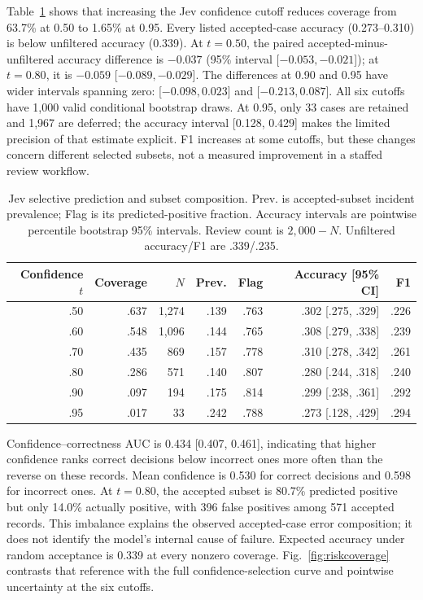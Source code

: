 \documentclass{llncs}
\begin{document}
Table~\ref{tab:selective} shows that increasing the Jev confidence cutoff reduces coverage from 63.7\% at 0.50 to 1.65\% at 0.95. Every listed accepted-case accuracy (0.273--0.310) is below unfiltered accuracy (0.339). At $t=0.50$, the paired accepted-minus-unfiltered accuracy difference is $-0.037$ (95\% interval [$-0.053,-0.021$]); at $t=0.80$, it is $-0.059$ [$-0.089,-0.029$]. The differences at 0.90 and 0.95 have wider intervals spanning zero: [$-0.098,0.023$] and [$-0.213,0.087$]. All six cutoffs have 1,000 valid conditional bootstrap draws. At 0.95, only 33 cases are retained and 1,967 are deferred; the accuracy interval [0.128, 0.429] makes the limited precision of that estimate explicit. F1 increases at some cutoffs, but these changes concern different selected subsets, not a measured improvement in a staffed review workflow.

\begin{table}[t]
\caption{Jev selective prediction and subset composition. Prev. is accepted-subset incident prevalence; Flag is its predicted-positive fraction. Accuracy intervals are pointwise percentile bootstrap 95\% intervals. Review count is $2{,}000-N$. Unfiltered accuracy/F1 are .339/.235.}\label{tab:selective}
\centering\small
\begin{tabular}{rrrrrrr}
\hline
Confidence $t$ & Coverage & $N$ & Prev. & Flag & Accuracy [95\% CI] & F1 \\
\hline
.50 & .637 & 1,274 & .139 & .763 & .302 [.275, .329] & .226 \\
.60 & .548 & 1,096 & .144 & .765 & .308 [.279, .338] & .239 \\
.70 & .435 & 869 & .157 & .778 & .310 [.278, .342] & .261 \\
.80 & .286 & 571 & .140 & .807 & .280 [.244, .318] & .240 \\
.90 & .097 & 194 & .175 & .814 & .299 [.238, .361] & .292 \\
.95 & .017 & 33 & .242 & .788 & .273 [.128, .429] & .294 \\
\hline
\end{tabular}
\end{table}

Confidence--correctness AUC is 0.434 [0.407, 0.461], indicating that higher confidence ranks correct decisions below incorrect ones more often than the reverse on these records. Mean confidence is 0.530 for correct decisions and 0.598 for incorrect ones. At $t=0.80$, the accepted subset is 80.7\% predicted positive but only 14.0\% actually positive, with 396 false positives among 571 accepted records. This imbalance explains the observed accepted-case error composition; it does not identify the model's internal cause of failure. Expected accuracy under random acceptance is 0.339 at every nonzero coverage. Fig.~\ref{fig:riskcoverage} contrasts that reference with the full confidence-selection curve and pointwise uncertainty at the six cutoffs.
\end{document}
